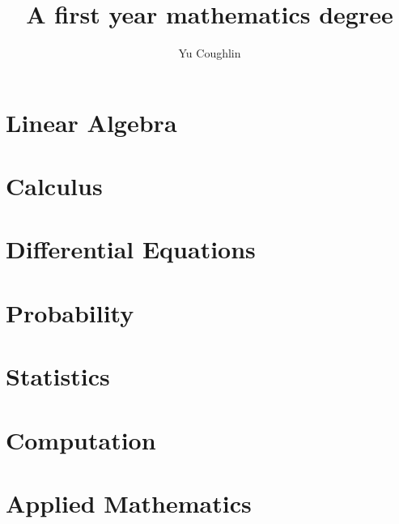 \documentclass{report}
\title{A first year mathematics degree}
\author{Yu Coughlin}
\date{ }
\begin{document}
\maketitle

\tableofcontents
\let\tableofcontents\relax


\chapter{Linear Algebra}


\chapter{Calculus}

\chapter{Differential Equations}

\chapter{Probability}

\chapter{Statistics}

\chapter{Computation}

\chapter{Applied Mathematics}

\end{document}
